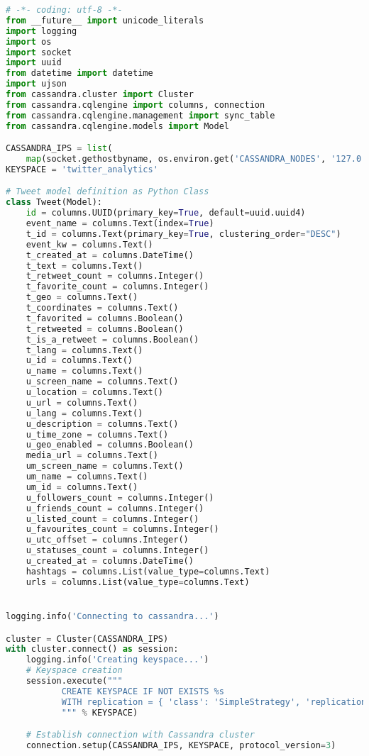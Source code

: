 \begin{lstlisting}[language=Python]
# -*- coding: utf-8 -*-
from __future__ import unicode_literals
import logging
import os
import socket
import uuid
from datetime import datetime
import ujson
from cassandra.cluster import Cluster
from cassandra.cqlengine import columns, connection
from cassandra.cqlengine.management import sync_table
from cassandra.cqlengine.models import Model

CASSANDRA_IPS = list(
    map(socket.gethostbyname, os.environ.get('CASSANDRA_NODES', '127.0.0.1').replace(' ', '').split(',')))
KEYSPACE = 'twitter_analytics'

# Tweet model definition as Python Class
class Tweet(Model):
    id = columns.UUID(primary_key=True, default=uuid.uuid4)
    event_name = columns.Text(index=True)
    t_id = columns.Text(primary_key=True, clustering_order="DESC")
    event_kw = columns.Text()
    t_created_at = columns.DateTime()
    t_text = columns.Text()
    t_retweet_count = columns.Integer()
    t_favorite_count = columns.Integer()
    t_geo = columns.Text()
    t_coordinates = columns.Text()
    t_favorited = columns.Boolean()
    t_retweeted = columns.Boolean()
    t_is_a_retweet = columns.Boolean()
    t_lang = columns.Text()
    u_id = columns.Text()
    u_name = columns.Text()
    u_screen_name = columns.Text()
    u_location = columns.Text()
    u_url = columns.Text()
    u_lang = columns.Text()
    u_description = columns.Text()
    u_time_zone = columns.Text()
    u_geo_enabled = columns.Boolean()
    media_url = columns.Text()
    um_screen_name = columns.Text()
    um_name = columns.Text()
    um_id = columns.Text()
    u_followers_count = columns.Integer()
    u_friends_count = columns.Integer()
    u_listed_count = columns.Integer()
    u_favourites_count = columns.Integer()
    u_utc_offset = columns.Integer()
    u_statuses_count = columns.Integer()
    u_created_at = columns.DateTime()
    hashtags = columns.List(value_type=columns.Text)
    urls = columns.List(value_type=columns.Text)


logging.info('Connecting to cassandra...')

cluster = Cluster(CASSANDRA_IPS)
with cluster.connect() as session:
    logging.info('Creating keyspace...')
    # Keyspace creation
    session.execute("""
           CREATE KEYSPACE IF NOT EXISTS %s
           WITH replication = { 'class': 'SimpleStrategy', 'replication_factor': '1' }
           """ % KEYSPACE)

    # Establish connection with Cassandra cluster
    connection.setup(CASSANDRA_IPS, KEYSPACE, protocol_version=3)


\end{lstlisting}

